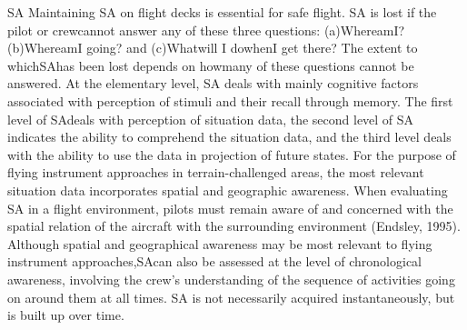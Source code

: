 \documentclass[utf8,bachelor,manualbib]{gradu3}
\begin{document}
SA
Maintaining SA on flight decks is essential for safe flight. SA is lost if the pilot or
crewcannot answer any of these three questions: (a)WhereamI? (b)WhereamI going?
and (c)Whatwill I dowhenI get there? The extent to whichSAhas been lost depends
on howmany of these questions cannot be answered. At the elementary level,
SA deals with mainly cognitive factors associated with perception of stimuli and
their recall through memory. The first level of SAdeals with perception of situation
data, the second level of SA indicates the ability to comprehend the situation data,
and the third level deals with the ability to use the data in projection of future states.
For the purpose of flying instrument approaches in terrain-challenged areas, the
most relevant situation data incorporates spatial and geographic awareness. When
evaluating SA in a flight environment, pilots must remain aware of and concerned
with the spatial relation of the aircraft with the surrounding environment (Endsley,
1995). Although spatial and geographical awareness may be most relevant to flying
instrument approaches,SAcan also be assessed at the level of chronological awareness,
involving the crew’s understanding of the sequence of activities going on
around them at all times. SA is not necessarily acquired instantaneously, but is built
up over time. \citep{schnell2004}
\end{document}
